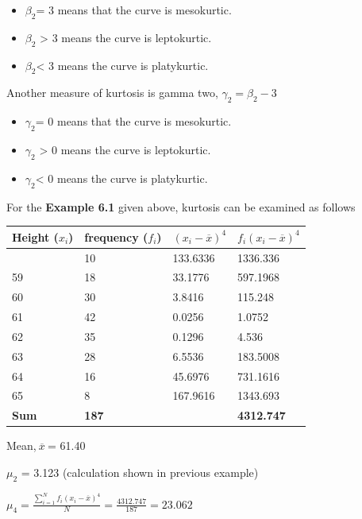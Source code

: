 \documentclass[
]{book}
\begin{document}
\begin{itemize}
\item
  \(\beta_{2}\)= 3 means that the curve is mesokurtic.
\item
  \(\beta_{2}\) \textgreater{} 3 means the curve is leptokurtic.
\item
  \(\beta_{2}\)\textless{} 3 means the curve is platykurtic.
\end{itemize}

Another measure of kurtosis is gamma two, \(\gamma_{2} = \beta_{2} - 3\ \)

\begin{itemize}
\item
  \(\gamma_{2}\)= 0 means that the curve is mesokurtic.
\item
  \(\gamma_{2}\) \textgreater{} 0 means the curve is leptokurtic.
\item
  \(\gamma_{2}\)\textless{} 0 means the curve is platykurtic.
\end{itemize}

For the \textbf{Example 6.1} given above, kurtosis can be examined as follows

\begin{longtable}[]{@{}llll@{}}
\toprule\noalign{}
Height (\(x_{i}\)) & frequency (\(f_{i}\)) & \(\left( x_{i} - \overline{x} \right)^{4}\) & \({f_{i}\left( x_{i} - \overline{x} \right)}^{4}\) \\
\midrule\noalign{}
\endhead
\bottomrule\noalign{}
\endlastfoot
58 & 10 & 133.6336 & 1336.336 \\
59 & 18 & 33.1776 & 597.1968 \\
60 & 30 & 3.8416 & 115.248 \\
61 & 42 & 0.0256 & 1.0752 \\
62 & 35 & 0.1296 & 4.536 \\
63 & 28 & 6.5536 & 183.5008 \\
64 & 16 & 45.6976 & 731.1616 \\
65 & 8 & 167.9616 & 1343.693 \\
\textbf{Sum} & \textbf{187} & & \textbf{4312.747} \\
\end{longtable}

Mean,\(\ \overline{x}\ \)= 61.40

\(\mu_{2}\) = 3.123 (calculation shown in previous example)

\(\mu_{4} = \frac{\sum_{i = 1}^{N}{f_{i}\left( x_{i} - \overline{x} \right)^{4}}}{N} = \frac{4312.747}{187} = 23.062\)
\end{document}
